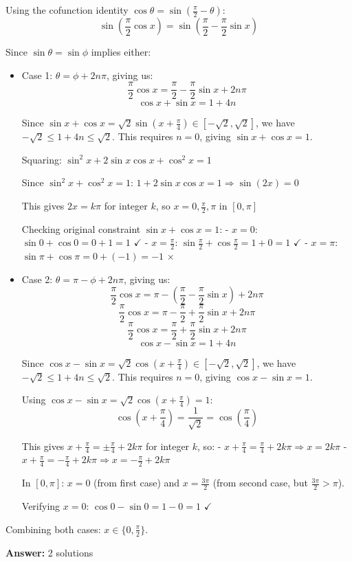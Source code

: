 \documentclass[12pt]{article}
\newenvironment{solution}
{\begin{tcolorbox}[colback=green!5!white,colframe=green!75!black,title={Solution}]}{\end{tcolorbox}}
\begin{document}
\begin{solution}
Using the cofunction identity $\cos\theta = \sin\left(\frac{\pi}{2} - \theta\right)$:
\[\sin\left(\frac{\pi}{2}\cos x\right) = \sin\left(\frac{\pi}{2} - \frac{\pi}{2}\sin x\right)\]

Since $\sin\theta = \sin\phi$ implies either:
\begin{itemize}
    \item Case 1: $\theta = \phi + 2n\pi$, giving us:
    \[\frac{\pi}{2}\cos x = \frac{\pi}{2} - \frac{\pi}{2}\sin x + 2n\pi\]
    \[\cos x + \sin x = 1 + 4n\]
    
    Since $\sin x + \cos x = \sqrt{2}\sin(x + \frac{\pi}{4}) \in [-\sqrt{2}, \sqrt{2}]$, 
    we have $-\sqrt{2} \leq 1 + 4n \leq \sqrt{2}$. This requires $n = 0$, giving $\sin x + \cos x = 1$.
    
    Squaring: $\sin^2 x + 2\sin x \cos x + \cos^2 x = 1$
    
    Since $\sin^2 x + \cos^2 x = 1$: $1 + 2\sin x \cos x = 1 \Rightarrow \sin(2x) = 0$
    
    This gives $2x = k\pi$ for integer $k$, so $x = 0, \frac{\pi}{2}, \pi$ in $[0,\pi]$
    
    Checking original constraint $\sin x + \cos x = 1$: 
    - $x = 0$: $\sin 0 + \cos 0 = 0 + 1 = 1$ $\checkmark$
    - $x = \frac{\pi}{2}$: $\sin\frac{\pi}{2} + \cos\frac{\pi}{2} = 1 + 0 = 1$ $\checkmark$
    - $x = \pi$: $\sin\pi + \cos\pi = 0 + (-1) = -1$ $\times$
    
    \item Case 2: $\theta = \pi - \phi + 2n\pi$, giving us:
    \[\frac{\pi}{2}\cos x = \pi - \left(\frac{\pi}{2} - \frac{\pi}{2}\sin x\right) + 2n\pi\]
    \[\frac{\pi}{2}\cos x = \pi - \frac{\pi}{2} + \frac{\pi}{2}\sin x + 2n\pi\]
    \[\frac{\pi}{2}\cos x = \frac{\pi}{2} + \frac{\pi}{2}\sin x + 2n\pi\]
    \[\cos x - \sin x = 1 + 4n\]
    
    Since $\cos x - \sin x = \sqrt{2}\cos(x + \frac{\pi}{4}) \in [-\sqrt{2}, \sqrt{2}]$, 
    we have $-\sqrt{2} \leq 1 + 4n \leq \sqrt{2}$. This requires $n = 0$, giving $\cos x - \sin x = 1$.
    
    Using $\cos x - \sin x = \sqrt{2}\cos(x + \frac{\pi}{4}) = 1$:
    \[\cos(x + \frac{\pi}{4}) = \frac{1}{\sqrt{2}} = \cos\left(\frac{\pi}{4}\right)\]
    
    This gives $x + \frac{\pi}{4} = \pm\frac{\pi}{4} + 2k\pi$ for integer $k$, so:
    - $x + \frac{\pi}{4} = \frac{\pi}{4} + 2k\pi \Rightarrow x = 2k\pi$
    - $x + \frac{\pi}{4} = -\frac{\pi}{4} + 2k\pi \Rightarrow x = -\frac{\pi}{2} + 2k\pi$
    
    In $[0,\pi]$: $x = 0$ (from first case) and $x = \frac{3\pi}{2}$ (from second case, but $\frac{3\pi}{2} > \pi$).
    
    Verifying $x = 0$: $\cos 0 - \sin 0 = 1 - 0 = 1$ $\checkmark$
\end{itemize}

Combining both cases: $x \in \{0, \frac{\pi}{2}\}$.

\textbf{Answer:} 2 solutions
\end{solution}
\end{document}
